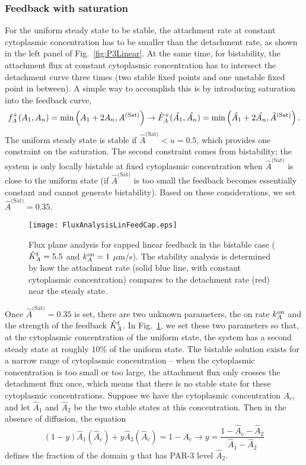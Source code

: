 \documentclass[11pt]{article}
\newcommand{\6}[1]{#1_{\text{6}}}
\newcommand{\3}[1]{#1_{\text{3}}}
\newcommand{\Sat}[1]{#1^\text{(Sat)}}
\begin{document}
\subsubsection{Feedback with saturation}
For the uniform steady state to be stable, the attachment rate at constant cytoplasmic concentration has to be smaller than the detachment rate, as shown in the left panel of Fig.\ \ref{fig:P3Linear}. At the same time, for bistability, the attachment flux at constant cytoplasmic concentration has to intersect the detachment curve three times (two stable fixed points and one unstable fixed point in between). A simple way to accomplish this is by introducing saturation into the feedback curve,
\begin{equation}
f_A^+(\MA,\PA) =\min\left(\MA+2\PA,\Sat{A}\right) \rightarrow \hat F_A^+(\hat \MA, \hat \PA) = \min\left(\hat \MA+2\hat \PA, \Sat{\hat A}\right). 
\end{equation}
The uniform steady state is stable if $\Sat{\hat A} < u = 0.5$, which provides one constraint on the saturation. The second constraint comes from bistability; the system is only locally bistable at fixed cytoplasmic concentration when $\Sat{\hat A}$ is close to the uniform state (if $\Sat{\hat A}$ is too small the feedback becomes essentially constant and cannot generate bistability). Based on these considerations, we set $\Sat{\hat A}=0.35$. 


\begin{figure}
\centering
\texttt{[image: FluxAnalysisLinFeedCap.eps]}
\caption{\label{fig:P3Cap}Flux plane analysis for capped linear feedback in the bistable case ($\hat{K}^\text{f}_A=5.5$ and $k^\text{on}_A=1$ $\mu$m/s). The stability analysis is determined by how the attachment rate (solid blue line, with constant cytoplasmic concentration) compares to the detachment rate (red) near the steady state. }
\end{figure}

Once $\Sat{\hat A}=0.35$ is set, there are two unknown parameters, the on rate $k^\text{on}_A$ and the strength of the feedback $\hat{K}^\text{f}_A$. In Fig.\ \ref{fig:P3Cap}, we set these two parameters so that, at the cytoplasmic concentration of the uniform state, the system has a second steady state at roughly 10\% of the uniform state. The bistable solution exists for a narrow range of cytoplasmic concentration -- when the cytoplasmic concentration is too small or too large, the attachment flux only crosses the detachment flux once, which means that there is no stable state for these cytoplasmic concentrations. Suppose we have the cytoplasmic concentration $A_c$, and let $\hat A_1$ and $\hat A_2$ be the two stable states at this concentration. Then in the absence of diffusion, the equation 
\begin{equation}
\label{eq:NoDiffEqn}
(1-y)\hat{A}_1\left(\hat A_c\right)+y \hat{A}_2\left(\hat A_c\right)=1-A_c \rightarrow y = \frac{1-\hat A_c-\hat A_2}{\hat A_1-\hat A_2}
\end{equation}
defines the fraction of the domain $y$ that has PAR-3 level $\hat A_2$.
\end{document}
